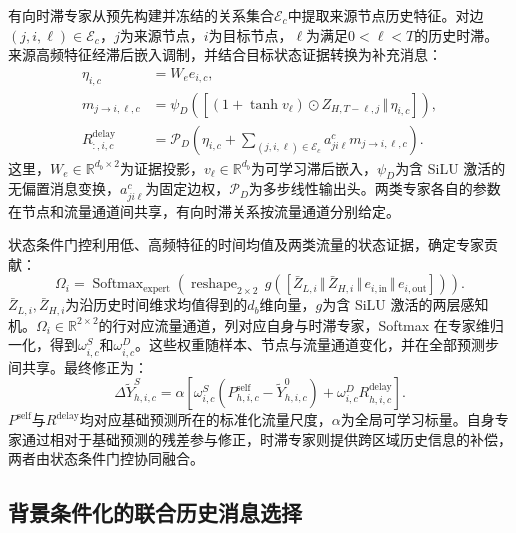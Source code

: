 有向时滞专家从预先构建并冻结的关系集合\(\mathcal{E}_c\)中提取来源节点历史特征。对边\((j,i,\ell)\in\mathcal{E}_c\)，\(j\)为来源节点，\(i\)为目标节点，\(\ell\)为满足\(0<\ell<T\)的历史时滞。来源高频特征经滞后嵌入调制，并结合目标状态证据转换为补充消息：
\begin{equation}
\label{eq:delay-expert}
\begin{aligned}
\eta_{i,c}&=W_e e_{i,c},\\
m_{j\to i,\ell,c}&=\psi_D\!\left([(1+\tanh v_{\ell})\odot Z_{H,T-\ell,j}\,\Vert\,\eta_{i,c}]\right),\\
R^{\mathrm{delay}}_{:,i,c}&=\mathcal{P}_D\!\left(\eta_{i,c}
+\sum_{(j,i,\ell)\in\mathcal{E}_c}a_{ji\ell}^{c}m_{j\to i,\ell,c}\right).
\end{aligned}
\end{equation}
这里，\(W_e\in\mathbb{R}^{d_b\times2}\)为证据投影，\(v_\ell\in\mathbb{R}^{d_b}\)为可学习滞后嵌入，\(\psi_D\)为含 SiLU 激活的无偏置消息变换，\(a_{ji\ell}^{c}\)为固定边权，\(\mathcal{P}_D\)为多步线性输出头。两类专家各自的参数在节点和流量通道间共享，有向时滞关系按流量通道分别给定。

状态条件门控利用低、高频特征的时间均值及两类流量的状态证据，确定专家贡献：
\begin{equation}
\label{eq:role-gate}
\Omega_i=\operatorname{Softmax}_{\mathrm{expert}}\!\left(
\operatorname{reshape}_{2\times2}\,g\!\left(
[\bar{Z}_{L,i}\,\Vert\,\bar{Z}_{H,i}\,\Vert\,e_{i,\mathrm{in}}\,\Vert\,e_{i,\mathrm{out}}]
\right)\right).
\end{equation}
\(\bar{Z}_{L,i},\bar{Z}_{H,i}\)为沿历史时间维求均值得到的\(d_b\)维向量，\(g\)为含 SiLU 激活的两层感知机。\(\Omega_i\in\mathbb{R}^{2\times2}\)的行对应流量通道，列对应自身与时滞专家，Softmax 在专家维归一化，得到\(\omega^S_{i,c}\)和\(\omega^D_{i,c}\)。这些权重随样本、节点与流量通道变化，并在全部预测步间共享。最终修正为：
\begin{equation}
\label{eq:serr-residual}
\Delta\widetilde{Y}^{S}_{h,i,c}
=\alpha\left[\omega^S_{i,c}\left(P^{\mathrm{self}}_{h,i,c}-\widetilde{Y}^{0}_{h,i,c}\right)
+\omega^D_{i,c}R^{\mathrm{delay}}_{h,i,c}\right].
\end{equation}
\(P^{\mathrm{self}}\)与\(R^{\mathrm{delay}}\)均对应基础预测所在的标准化流量尺度，\(\alpha\)为全局可学习标量。自身专家通过相对于基础预测的残差参与修正，时滞专家则提供跨区域历史信息的补偿，两者由状态条件门控协同融合。

\subsection{背景条件化的联合历史消息选择}\label{sec:bcms}

